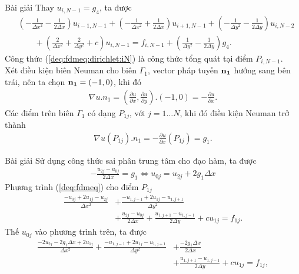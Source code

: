 \documentclass[9pt]{beamer}
\numberwithin{equation}{section}
\begin{document}
\begin{frame}
\begin{exampleblock}{Bài giải}
    Thay $u_{i,N-1} = g_4$, ta được
    \begin{align}
        &\left(-\frac{1}{\Delta x^2} - \frac{1}{2\Delta x}\right) u_{i-1,N-1} +
        \left(-\frac{1}{\Delta x^2} + \frac{1}{2\Delta x}\right) u_{i+1,N-1} +
        \left(-\frac{1}{\Delta y^2} - \frac{1}{2\Delta y}\right) u_{i,N-2} \nonumber \\ &\quad \quad +
        \left(\frac{2}{\Delta x^2} + \frac{2}{\Delta y^2} + c\right) u_{i,N-1} =
        f_{i,N-1} + \left(\frac{1}{\Delta y^2} - \frac{1}{2\Delta y}\right) g_4. \label{deq:fdmeq:dirichlet:iN}
    \end{align}
    Công thức (\ref{deq:fdmeq:dirichlet:iN}) là công thức tổng quát tại điểm $P_{i,N-1}$. \\

    Xét điều kiện biên Neuman cho biên $\Gamma_1$, vector pháp tuyến ${\bf n_1}$ hướng sang bên trái, nên ta chọn ${\bf n_1} = (-1, 0)$, khi đó
    \begin{align*}
        \nabla u . n_1 = \left(\frac{\partial u}{\partial x}, \frac{\partial u}{\partial y}\right) . (-1,0) = -\frac{\partial u}{\partial x}.
    \end{align*}
    Các điểm trên biên $\Gamma_1$ có dạng $P_{1j}$, với $j = 1 \ldots N$, khi đó điều kiện Neuman trở thành
    \begin{align*}
        \nabla u(P_{1j}) . n_1 = -\frac{\partial u}{\partial x}(P_{1j}) = g_1.
    \end{align*}
\end{exampleblock}
\end{frame}

\begin{frame}
\begin{exampleblock}{Bài giải}
    Sử dụng công thức sai phân trung tâm cho đạo hàm, ta được
    \begin{align*}
        -\frac{u_{2j} - u_{0j}}{2 \Delta x} = g_1 \Leftrightarrow u_{0j} = u_{2j} + 2 g_1 \Delta x
    \end{align*}
    Phương trình (\ref{deq:fdmeq}) cho điểm $P_{1j}$
    \begin{align*}
        \frac{-u_{0j} + 2u_{1j} - u_{2j}}{\Delta x^2} &+
        \frac{-u_{1,j-1} + 2u_{1j} - u_{1,j+1}}{\Delta y^2} \\&+
        \frac{u_{2j} - u_{0j}}{2 \Delta x} +
        \frac{u_{1,j+1} - u_{1,j-1}}{2 \Delta y} +
        c u_{1j} = f_{1j}.
    \end{align*}
    Thế $u_{0j}$ vào phương trình trên, ta được
    \begin{align*}
        \frac{-2u_{2j} - 2g_1 \Delta x + 2u_{1j}}{\Delta x^2} +
        \frac{-u_{1,j-1} + 2u_{1j} - u_{1,j+1}}{\Delta y^2} &+
        \frac{-2g_1 \Delta x}{2\Delta x} \\&+
        \frac{u_{1,j+1} - u_{1,j-1}}{2 \Delta y} +
        c u_{1j} = f_{1j},
    \end{align*}
\end{exampleblock}
\end{frame}
\end{document}
